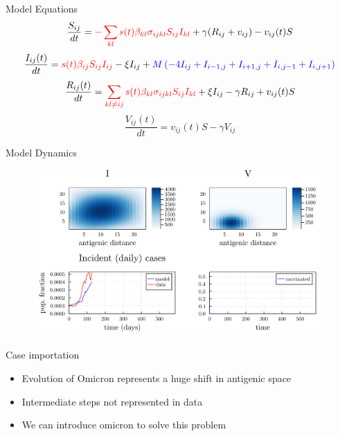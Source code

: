\documentclass{beamer}
\begin{document}
\begin{frame}{Model Equations}
    \small
    \begin{equation}
        \frac{S_{ij}}{dt} = \textcolor{myred}{-\sum_{kl} s(t) \beta_{kl} \sigma_{ijkl} S_{ij} I_{kl}} + \gamma (R_{ij} + v_{ij})  - v_{ij}(t)S  \label{Seqn}
    \end{equation}
    \begin{equation}
        \frac{ I_{ij}(t)}{dt} = \textcolor{myred}{s(t) \beta_{ij} S_{ij} I_{ij}} - \xi I_{ij} + \textcolor{myblue}{M \left(- 4I_{ij} + I_{i-1,j}  + I_{i+1,j} + I_{i,j-1} + I_{i,j+1} \right)} \label{Ieqn}    
    \end{equation}
    \begin{equation}
        \frac{R_{ij}(t)}{dt} =  \textcolor{myred}{\sum_{kl \neq ij} s(t) \beta_{kl} \sigma_{ijkl} S_{ij} I_{kl}} + \xi I_{ij} - \gamma R_{ij} + v_{ij}(t)S \label{Reqn}
    \end{equation}
    \begin{equation}
    \frac{V_{ij}(t)}{dt} =  v_{ij}(t)S  - \gamma V_{ij}  \label{Veqn}
    \end{equation}
\end{frame}

\begin{frame}{Model Dynamics}
    \begin{figure} 
        \includegraphics[width=1.1\textwidth]{2022-07-12-01-13-30.png}
    \end{figure}
\end{frame}


\begin{frame}{Case importation}
    \begin{itemize}
        \item Evolution of Omicron represents a huge shift in antigenic space
        \item Intermediate steps not represented in data
        \item We can introduce omicron to solve this problem
    \end{itemize}
\end{frame}
\end{document}
